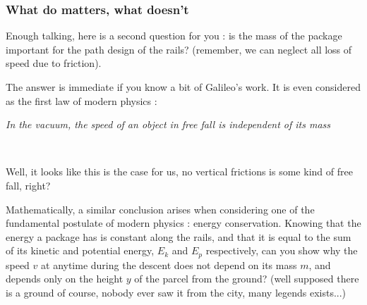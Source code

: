 \documentclass{article}
\begin{document}
\subsubsection*{What do matters, what doesn't}

Enough talking, here is a second question for you : is the mass of the package important for the path design of the rails? (remember, we can neglect all loss of speed due to friction).

The answer is immediate if you know a bit of Galileo's work. It is even considered as the first law of modern physics :\\

\begin{tcolorbox}
\begin{center}
  \textit{In the vacuum, the speed of an object in free fall is independent of its mass}
\end{center}
\end{tcolorbox}
~

Well, it looks like this is the case for us, no vertical frictions is some kind of free fall, right?

Mathematically, a similar conclusion arises when considering one of the fundamental postulate of modern physics : energy conservation. Knowing that the energy a package has is constant along the rails, and that it is equal to the sum of its kinetic and potential energy, $E_k$ and $E_p$ respectively, can you show why the speed $v$ at anytime during the descent does not depend on its mass $m$, and depends only on the height $y$ of the parcel from the ground? (well supposed there is a ground of course, nobody ever saw it from the city, many legends exists...)
\end{document}
